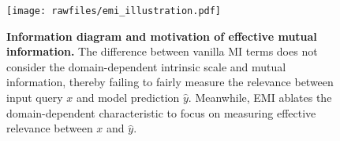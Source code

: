 \begin{figure}[t]
    \centering
    \texttt{[image: rawfiles/emi\_illustration.pdf]}
    \caption{\textbf{Information diagram and motivation of effective mutual information.} The difference between vanilla MI terms does not consider the domain-dependent intrinsic scale and mutual information, thereby failing to fairly measure the relevance between input query $x$ and model prediction $\hat{y}$. Meanwhile, EMI ablates the domain-dependent characteristic to focus on measuring effective relevance between $x$ and $\hat{y}$.}
    \label{fig:emi_motivation}
\end{figure}